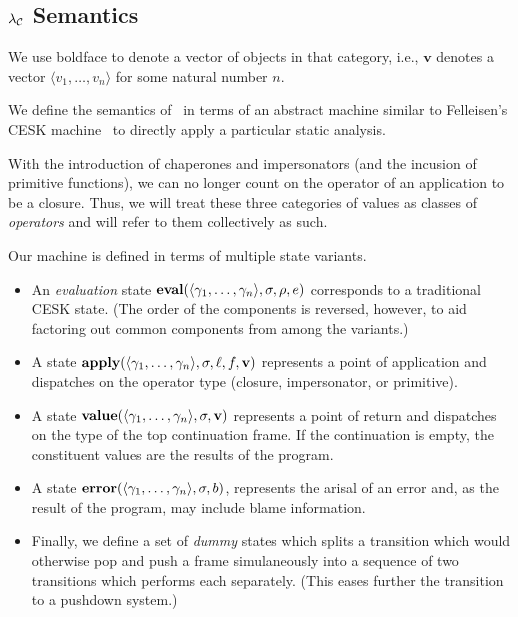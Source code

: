 \documentclass{sigplanconf}
\begin{document}
\subsection{$\lambda_{\mathcal{C}}$ Semantics}


We use boldface to denote a vector of objects in that category, i.e., $\mathbf{v}$ denotes a vector $\langle v_1,\dots,v_n\rangle$ for some natural number $n$.

We define the semantics of \chapcalc\ in terms of an abstract machine similar to Felleisen's CESK machine~\cite{felleisen1987calculus} to directly apply a particular static analysis.

With the introduction of chaperones and impersonators (and the incusion of primitive functions), we can no longer count on the operator of an application to be a closure.
Thus, we will treat these three categories of values as classes of \emph{operators} and will refer to them collectively as such.

Our machine is defined in terms of multiple state variants.
\begin{itemize}
\item An \emph{evaluation} state $\mathbf{eval}(\langle\gamma_1,\dots,\gamma_n\rangle,\sigma,\rho,e)$ corresponds to a traditional CESK state.
(The order of the components is reversed, however, to aid factoring out common components from among the variants.)


\item A state $\mathbf{apply}(\langle\gamma_1,\dots,\gamma_n\rangle,\sigma,\ell,f,\mathbf{v})$ represents a point of application and dispatches on the operator type (closure, impersonator, or primitive).
\item A state $\mathbf{value}(\langle\gamma_1,\dots,\gamma_n\rangle,\sigma,\mathbf{v})$ represents a point of return and dispatches on the type of the top continuation frame.
If the continuation is empty, the constituent values are the results of the program.
\item A state $\mathbf{error}(\langle\gamma_1,\dots,\gamma_n\rangle,\sigma,b)$, represents the arisal of an error and, as the result of the program, may include blame information.
\item Finally, we define a set of \emph{dummy} states which splits a transition which would otherwise pop and push a frame simulaneously into a sequence of two transitions which performs each separately.
(This eases further the transition to a pushdown system.)
\end{itemize}
\end{document}
